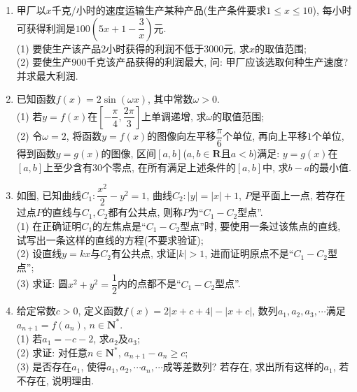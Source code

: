\documentclass[10pt,a4paper]{article}
\begin{document}
\begin{enumerate}[1.]
\begin{center}
\end{center}
\item 甲厂以$x$千克/小时的速度运输生产某种产品(生产条件要求$1\le x\le 10$), 每小时可获得利润是$100(5x+1-\dfrac 3x)$元.\\
(1) 要使生产该产品$2$小时获得的利润不低于$3000$元, 求$x$的取值范围;\\
(2) 要使生产$900$千克该产品获得的利润最大, 问: 甲厂应该选取何种生产速度? 并求最大利润.
\item 已知函数$f(x)=2\sin (\omega x)$, 其中常数$\omega >0$.\\
(1) 若$y=f(x)$在$[-\dfrac{\pi }4,\dfrac{2\pi }3]$上单调递增, 求$\omega$的取值范围;\\
(2) 令$\omega =2$, 将函数$y=f(x)$的图像向左平移$\dfrac{\pi }6$个单位, 再向上平移$1$个单位, 得到函数$y=g(x)$的图像, 区间$[a,b]$($a,b\in \mathbf{R}$且$a<b$)满足: $y=g(x)$在$[a,b]$上至少含有$30$个零点, 在所有满足上述条件的$[a,b]$中, 求$b-a$的最小值.
\item 如图, 已知曲线$C_1:\dfrac{x^2}2-y^2=1$, 曲线$C_2:|y|=|x|+1$, $P$是平面上一点, 若存在过点$P$的直线与$C_1,C_2$都有公共点, 则称$P$为``$C_1-C_2$型点''.\\
(1) 在正确证明$C_1$的左焦点是``$C_1-C_2$型点''时, 要使用一条过该焦点的直线, 试写出一条这样的直线的方程(不要求验证);\\
(2) 设直线$y=kx$与$C_2$有公共点, 求证$|k|>1$, 进而证明原点不是``$C_1-C_2$型点'';\\
(3) 求证: 圆$x^2+y^2=\dfrac 12$内的点都不是``$C_1-C_2$型点''.
\item 给定常数$c>0$, 定义函数$f(x)=2|x+c+4|-|x+c|$, 数列$a_1,a_2,a_3,\cdots$满足$a_{n+1}=f(a_n)$, $n\in \mathbf{N}^*$.\\
(1) 若$a_1=-c-2$, 求$a_2$及$a_3$;\\
(2) 求证: 对任意$n\in \mathbf{N}^*$, $a_{n+1}-a_n\ge c$;\\
(3) 是否存在$a_1$, 使得$a_1,a_2,\cdots a_n,\cdots$成等差数列? 若存在, 求出所有这样的$a_1$, 若不存在, 说明理由.


\end{enumerate}
\end{document}
